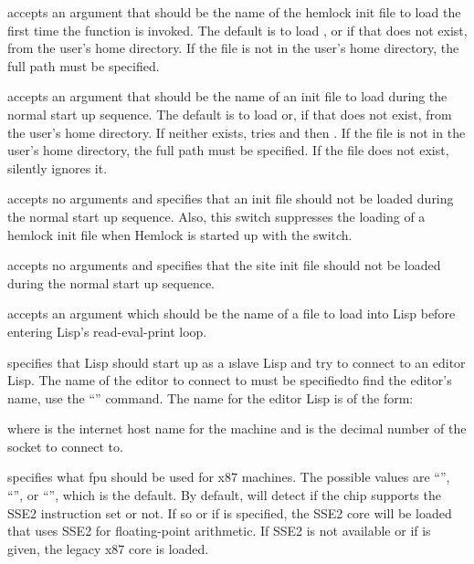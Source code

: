 \begin{Lentry}
\item[\code{-hinit}] accepts an argument that should be the name of
  the hemlock init file to load the first time the function
   is invoked.  The default is to load
  , or if that does not exist,
   from the user's home directory.  If the
  file is not in the user's home directory, the full path must be
  specified.
  
\item[\code{-init}] accepts an argument that should be the name of an
  init file to load during the normal start up sequence.  The default
  is to load  or, if that does not exist,
   from the user's home directory.  If neither exists,
  \cmucl tries  and then
  .  If the file is not
  in the user's home directory, the full path must be specified.  If
  the file does not exist, \cmucl silently ignores it.
  
\item[\code{-noinit}] accepts no arguments and specifies that an init
  file should not be loaded during the normal start up sequence.
  Also, this switch suppresses the loading of a hemlock init file when
  Hemlock is started up with the  switch.

\item[\code{-nositeinit}] accepts no arguments and specifies that the
  site init file should not be loaded during the normal start up
  sequence. 

\item[\code{-load}] accepts an argument which should be the name of a
  file to load into Lisp before entering Lisp's read-eval-print loop.
  
\item[\code{-slave}] specifies that Lisp should start up as a
  \i{slave} Lisp and try to connect to an editor Lisp.  The name of
  the editor to connect to must be specified\dash{}to find the
  editor's name, use the \hemlock{} ``'' command.  The name for the editor Lisp is of the
  form:
  \begin{example}
    \code{:}
  \end{example}
  where  is the internet host name for the machine
  and  is the decimal number of the socket to connect to.

\item[\code{-fpu}] specifies what fpu should be used for x87 machines.
  The possible values are ``'', ``'', or
  ``'', which is the default.  By default, \cmucl will
  detect if the chip supports the SSE2 instruction set or not.  If so
  or if  is specified, the SSE2 core will be loaded
  that uses SSE2 for floating-point arithmetic.  If SSE2 is not
  available or if  is given, the legacy x87 core is
  loaded.


\end{Lentry}
